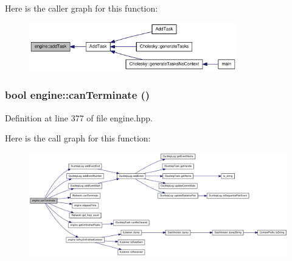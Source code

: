 Here is the caller graph for this function:\nopagebreak
\begin{figure}[H]
\begin{center}
\leavevmode
\includegraphics[width=256pt]{classengine_aa22a2fc88b7283b840e6db1e45dbdd5b_icgraph}
\end{center}
\end{figure}
\hypertarget{classengine_acf7ab54eb2e616e471686ec14157c9e7}{
\subsubsection[{canTerminate}]{\setlength{\rightskip}{0pt plus 5cm}bool engine::canTerminate ()}}
\label{classengine_acf7ab54eb2e616e471686ec14157c9e7}


Definition at line 377 of file engine.hpp.

Here is the call graph for this function:\nopagebreak
\begin{figure}[H]
\begin{center}
\leavevmode
\includegraphics[width=420pt]{classengine_acf7ab54eb2e616e471686ec14157c9e7_cgraph}
\end{center}
\end{figure}


